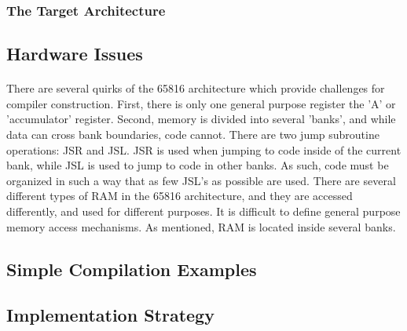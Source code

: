 \documentclass {article}
\begin{document}
\subsubsection{The Target Architecture}
\subsection{Hardware Issues}
\paragraph{}
There are several quirks of the 65816 architecture which provide
challenges for compiler construction.  First, there is only one
general purpose register the 'A' or 'accumulator' register.  Second,
memory is divided into several 'banks', and while data can cross bank
boundaries, code cannot.  There are two jump subroutine operations:
JSR and JSL.  JSR is used when jumping to code inside of the current
bank, while JSL is used to jump to code in other banks.  As such, code
must be organized in such a way that as few JSL's as possible are
used.  There are several different types of RAM in the 65816
architecture, and they are accessed differently, and used for
different purposes.  It is difficult to define general purpose memory
access mechanisms.  As mentioned, RAM is located inside several banks.

\subsection{Simple Compilation Examples}
\subsection{Implementation Strategy}
\end{document}
